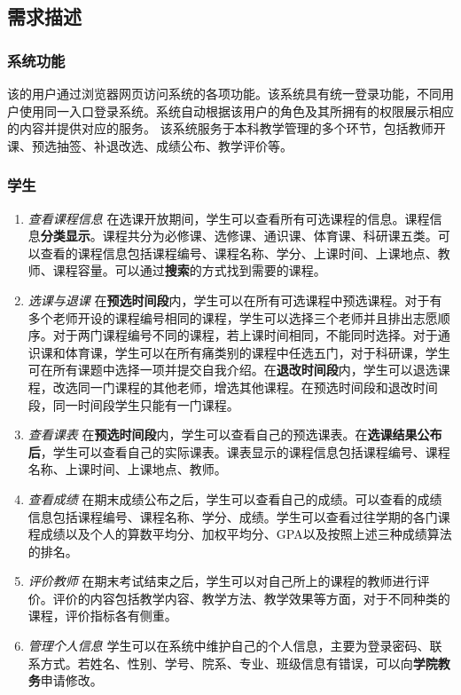 \subsection{需求描述}

\subsubsection{系统功能}
\ttfamily
该的用户通过浏览器{\sffamily 网页}访问系统的各项功能。该系统具有{\sffamily 统一登录}功能，不同用户使用同一入口登录系统。系统自动根据该用户的角色及其所拥有的权限展示相应的内容并提供对应的服务。
该系统服务于本科教学管理的多个环节，包括教师开课、预选抽签、补退改选、成绩公布、教学评价等。

\normalfont

\subsubsection{学生}
\begin{enumerate}
    \item \textit{查看课程信息} \quad 在选课开放期间，学生可以查看所有可选课程的信息。课程信息\textbf{分类显示}。课程共分为必修课、选修课、通识课、体育课、科研课五类。可以查看的课程信息包括课程编号、课程名称、学分、上课时间、上课地点、教师、课程容量。可以通过\textbf{搜索}的方式找到需要的课程。
    \item \textit{选课与退课} \quad 在\textbf{预选时间段}内，学生可以在所有可选课程中预选课程。对于有多个老师开设的课程编号相同的课程，学生可以选择三个老师并且排出志愿顺序。对于两门课程编号不同的课程，若上课时间相同，不能同时选择。对于通识课和体育课，学生可以在所有痛类别的课程中任选五门，对于科研课，学生可在所有课题中选择一项并提交自我介绍。在\textbf{退改时间段}内，学生可以退选课程，改选同一门课程的其他老师，增选其他课程。在预选时间段和退改时间段，同一时间段学生只能有一门课程。
    \item \textit{查看课表} \quad 在\textbf{预选时间段}内，学生可以查看自己的预选课表。在\textbf{选课结果公布后}，学生可以查看自己的实际课表。课表显示的课程信息包括课程编号、课程名称、上课时间、上课地点、教师。
    \item \textit{查看成绩} \quad 在期末成绩公布之后，学生可以查看自己的成绩。可以查看的成绩信息包括课程编号、课程名称、学分、成绩。学生可以查看过往学期的各门课程成绩以及个人的算数平均分、加权平均分、GPA以及按照上述三种成绩算法的排名。
    \item \textit{评价教师} \quad 在期末考试结束之后，学生可以对自己所上的课程的教师进行评价。评价的内容包括教学内容、教学方法、教学效果等方面，对于不同种类的课程，评价指标各有侧重。
    \item \textit{管理个人信息} \quad 学生可以在系统中维护自己的个人信息，主要为登录密码、联系方式。若姓名、性别、学号、院系、专业、班级信息有错误，可以向\textbf{学院教务}申请修改。
\end{enumerate}

